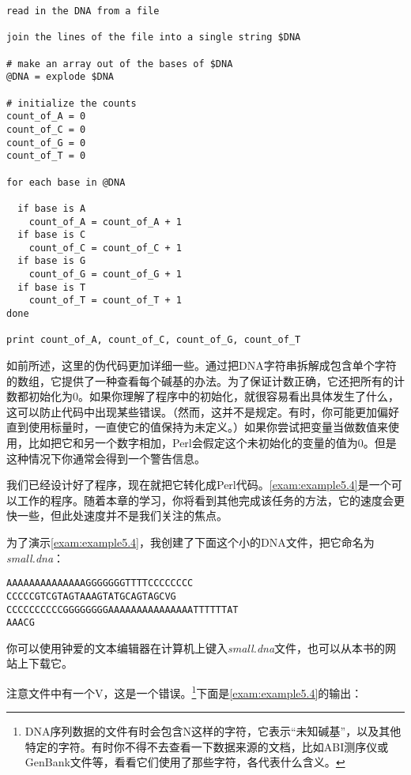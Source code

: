 \begin{lstlisting}
read in the DNA from a file

join the lines of the file into a single string $DNA

# make an array out of the bases of $DNA
@DNA = explode $DNA

# initialize the counts
count_of_A = 0
count_of_C = 0
count_of_G = 0
count_of_T = 0

for each base in @DNA

  if base is A
    count_of_A = count_of_A + 1
  if base is C
    count_of_C = count_of_C + 1
  if base is G
    count_of_G = count_of_G + 1
  if base is T
    count_of_T = count_of_T + 1
done

print count_of_A, count_of_C, count_of_G, count_of_T
\end{lstlisting}

如前所述，这里的伪代码更加详细一些。通过把DNA字符串拆解成包含单个字符的数组，它提供了一种查看每个碱基的办法。为了保证计数正确，它还把所有的计数都初始化为0。如果你理解了程序中的初始化，就很容易看出具体发生了什么，这可以防止代码中出现某些错误。（然而，这并不是规定。有时，你可能更加偏好直到使用标量时，一直使它的值保持为未定义。）如果你尝试把变量当做数值来使用，比如把它和另一个数字相加，Perl会假定这个未初始化的变量的值为0。但是这种情况下你通常会得到一个警告信息。

我们已经设计好了程序，现在就把它转化成Perl代码。\autoref{exam:example5.4}是一个可以工作的程序。随着本章的学习，你将看到其他完成该任务的方法，它的速度会更快一些，但此处速度并不是我们关注的焦点。



为了演示\autoref{exam:example5.4}，我创建了下面这个小的DNA文件，把它命名为\textit{small.dna}：

\begin{lstlisting}
AAAAAAAAAAAAAAGGGGGGGTTTTCCCCCCCC
CCCCCGTCGTAGTAAAGTATGCAGTAGCVG
CCCCCCCCCCGGGGGGGGAAAAAAAAAAAAAAATTTTTTAT
AAACG
\end{lstlisting}

你可以使用钟爱的文本编辑器在计算机上键入\textit{small.dna}文件，也可以从本书的网站上下载它。

注意文件中有一个V，这是一个错误。\footnote{DNA序列数据的文件有时会包含N这样的字符，它表示“未知碱基”，以及其他特定的字符。有时你不得不去查看一下数据来源的文档，比如ABI测序仪或GenBank文件等，看看它们使用了那些字符，各代表什么含义。}下面是\autoref{exam:example5.4}的输出：

